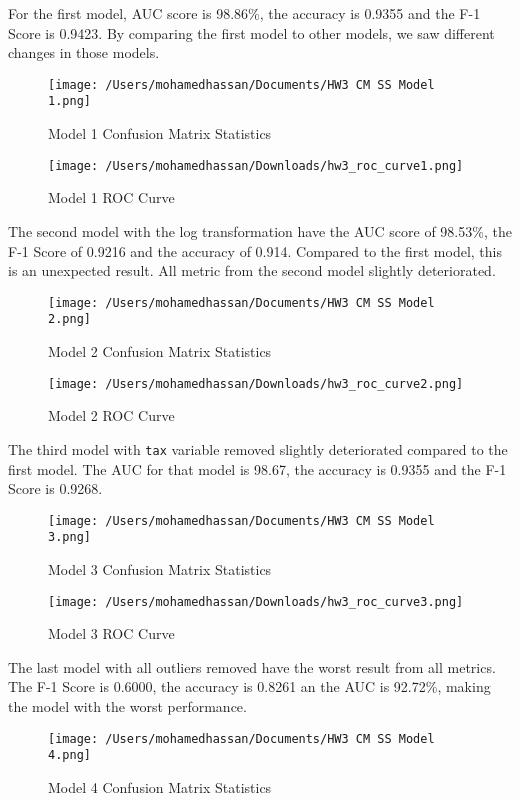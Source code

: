 \documentclass[
]{article}
\begin{document}
For the first model, AUC score is 98.86\%, the accuracy is 0.9355 and
the F-1 Score is 0.9423. By comparing the first model to other models,
we saw different changes in those models.

\begin{figure}
\centering
\texttt{[image: /Users/mohamedhassan/Documents/HW3 CM SS Model 1.png]}
\caption{Model 1 Confusion Matrix Statistics}
\end{figure}

\begin{figure}
\centering
\texttt{[image: /Users/mohamedhassan/Downloads/hw3\_roc\_curve1.png]}
\caption{Model 1 ROC Curve}
\end{figure}

The second model with the log transformation have the AUC score of
98.53\%, the F-1 Score of 0.9216 and the accuracy of 0.914. Compared to
the first model, this is an unexpected result. All metric from the
second model slightly deteriorated.

\begin{figure}
\centering
\texttt{[image: /Users/mohamedhassan/Documents/HW3 CM SS Model 2.png]}
\caption{Model 2 Confusion Matrix Statistics}
\end{figure}

\begin{figure}
\centering
\texttt{[image: /Users/mohamedhassan/Downloads/hw3\_roc\_curve2.png]}
\caption{Model 2 ROC Curve}
\end{figure}

The third model with \texttt{tax} variable removed slightly deteriorated
compared to the first model. The AUC for that model is 98.67, the
accuracy is 0.9355 and the F-1 Score is 0.9268.

\begin{figure}
\centering
\texttt{[image: /Users/mohamedhassan/Documents/HW3 CM SS Model 3.png]}
\caption{Model 3 Confusion Matrix Statistics}
\end{figure}

\begin{figure}
\centering
\texttt{[image: /Users/mohamedhassan/Downloads/hw3\_roc\_curve3.png]}
\caption{Model 3 ROC Curve}
\end{figure}

The last model with all outliers removed have the worst result from all
metrics. The F-1 Score is 0.6000, the accuracy is 0.8261 an the AUC is
92.72\%, making the model with the worst performance.

\begin{figure}
\centering
\texttt{[image: /Users/mohamedhassan/Documents/HW3 CM SS Model 4.png]}
\caption{Model 4 Confusion Matrix Statistics}
\end{figure}
\end{document}
